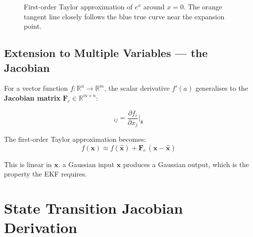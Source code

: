 \documentclass[12pt,a4paper]{article}
\newcommand{\bx}{\bm{x}}
\newcommand{\bF}{\bm{F}}
\begin{document}
{\begin{figure}[H]
\centering
{}
\caption{First-order Taylor approximation of $e^x$ around $x=0$.
         The orange tangent line closely follows the blue true curve near
         the expansion point.}
\label{fig:taylor}
\end{figure}

\subsection{Extension to Multiple Variables — the Jacobian}

For a vector function $f: \mathbb{R}^n \to \mathbb{R}^m$, the scalar
derivative $f'(a)$ generalises to the \textbf{Jacobian matrix}
$\bF_c \in \mathbb{R}^{m \times n}$:

\begin{equation}
  [\bF_c]_{ij} = \frac{\partial f_i}{\partial x_j}\bigg|_{\hat{\bx}}
\end{equation}

The first-order Taylor approximation becomes:
\begin{equation}
  f(\bx) \approx f(\hat{\bx}) + \bF_c\,(\bx - \hat{\bx})
\end{equation}

This is linear in $\bx$.  a Gaussian input $\bx$ produces a Gaussian output,
which is the property the EKF requires.

\section{State Transition Jacobian Derivation}
\label{app:State-Transition-Jacobian}

}
\end{document}
